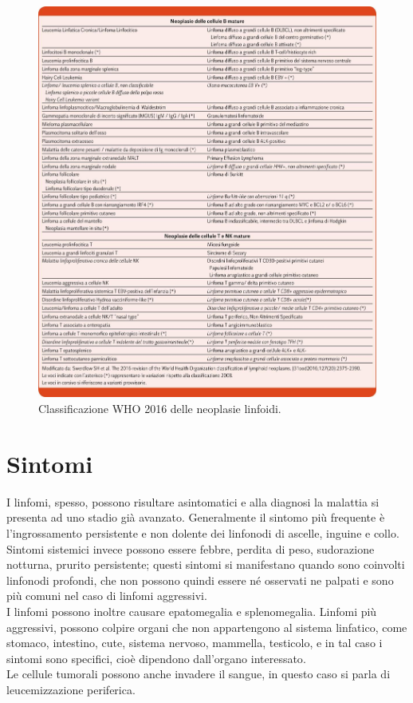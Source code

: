 \begin{figure}[H]
    \begin{center}
    \includegraphics[width=1.0\columnwidth]{img/CLASS.WHO.jpeg}
    \end{center}
    \caption[Classificazione WHO 2016 delle neoplasie linfoidi.]{Classificazione WHO 2016 delle neoplasie linfoidi.
    \cite{img15}}

\end{figure}

\section{Sintomi}
I linfomi, spesso, possono risultare asintomatici e alla diagnosi la malattia si presenta ad uno stadio già avanzato.
Generalmente il sintomo più frequente è l’ingrossamento persistente e non dolente dei linfonodi di ascelle, inguine e 
collo\cite{LNHAIL}.\\ 
Sintomi sistemici invece possono essere febbre, perdita di peso, sudorazione notturna, prurito persistente; 
questi sintomi si manifestano quando sono coinvolti linfonodi profondi, che non possono quindi essere né osservati 
ne palpati e sono più comuni nel caso di linfomi aggressivi.\\ 
I linfomi possono inoltre causare epatomegalia e splenomegalia\cite{AMERICANCANCER}. 
Linfomi più aggressivi, possono colpire organi che non appartengono al sistema linfatico, come stomaco, intestino, 
cute, sistema nervoso, mammella, testicolo, e in tal caso i sintomi sono specifici, cioè dipendono 
dall’organo interessato\cite{AMERICANCANCER}.\\ 
Le cellule tumorali possono anche invadere il sangue, in questo caso si parla di leucemizzazione periferica\cite{LNHAIL}.


